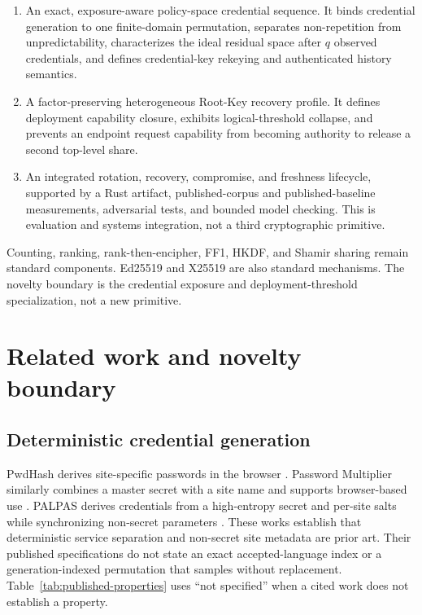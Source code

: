 \documentclass[preprint,12pt]{elsarticle}
\begin{document}
\begin{enumerate}
\item An exact, exposure-aware policy-space credential sequence. It binds
  credential generation to one finite-domain permutation, separates
  non-repetition from unpredictability, characterizes the ideal residual space
  after $q$ observed credentials, and defines credential-key rekeying and
  authenticated history semantics.
\item A factor-preserving heterogeneous Root-Key recovery profile. It defines
  deployment capability closure, exhibits logical-threshold collapse, and
  prevents an endpoint request capability from becoming authority to release a
  second top-level share.
\item An integrated rotation, recovery, compromise, and freshness lifecycle,
  supported by a Rust artifact, published-corpus and published-baseline
  measurements, adversarial tests, and bounded model checking. This is
  evaluation and systems integration, not a third cryptographic primitive.
\end{enumerate}

Counting, ranking, rank-then-encipher, FF1, HKDF, and Shamir sharing remain
standard components. Ed25519 and X25519 are also standard mechanisms. The
novelty boundary is the credential exposure and deployment-threshold
specialization, not a new primitive.

\section{Related work and novelty boundary}

\subsection{Deterministic credential generation}

PwdHash derives site-specific passwords in the browser
\cite{ross2005pwdhash}. Password Multiplier similarly combines a master secret
with a site name and supports browser-based use
\cite{halderman2005multiplier}. PALPAS derives credentials from a high-entropy
secret and per-site salts while synchronizing non-secret parameters
\cite{palpas}. These works establish that deterministic service separation and
non-secret site metadata are prior art. Their published specifications do not
state an exact accepted-language index or a generation-indexed permutation
that samples without replacement. Table~\ref{tab:published-properties} uses
``not specified'' when a cited work does not establish a property.
\end{document}
